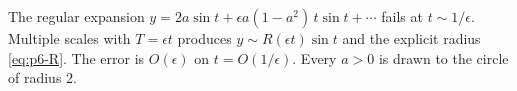 \begin{summary}[Problem~6]
\label{sum:p6}
The regular expansion \(y=2a\sin t+\epsilon a(1-a^2)\,t\sin t+\cdots\) fails at \(t\sim 1/\epsilon\). Multiple scales with \(T=\epsilon t\) produces \(y\sim R(\epsilon t)\sin t\) and the explicit radius \eqref{eq:p6-R}. The error is \(O(\epsilon)\) on \(t=O(1/\epsilon)\). Every \(a>0\) is drawn to the circle of radius \(2\).
\end{summary}
